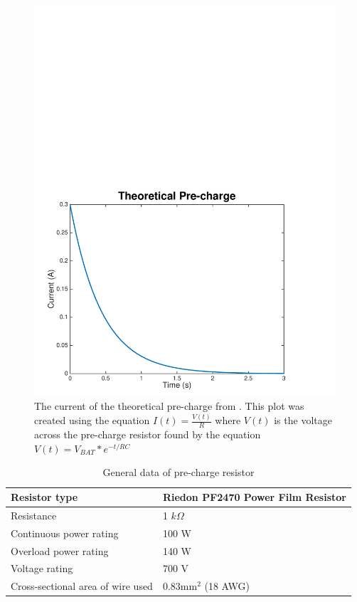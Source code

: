 \documentclass{article}
\begin{document}
\begin{figure}[H]
    \centering
    \includegraphics[width = 0.8 \textwidth]{precharge_current}
    \caption{The current of the theoretical pre-charge from . This plot was created using the equation $I(t) = \frac{V(t)}{R}$ where $V(t)$ is the voltage across the pre-charge resistor found by the equation $V(t) = V_{BAT} * e^{-t/RC}$ }
    \label{fig:precharge_current}
\end{figure}

    \begin{table}[H]
	    \centering
	    \begin{tabular}{|l|l|}
	    \hline
	    Resistor type & Riedon PF2470 Power Film Resistor \\ \hline
	    Resistance & 1 $k\Omega$ \\ \hline
	    Continuous power rating & 100 W \\ \hline
	    Overload power rating & 140 W \\ \hline
	    Voltage rating & 700 V \\ \hline
	    Cross-sectional area of wire used & 0.83mm$^2$ (18 AWG)\\ \hline
	    \end{tabular}
	    \caption{General data of pre-charge resistor}
	    \label{prechargeresistor}
	\end{table}
\end{document}
